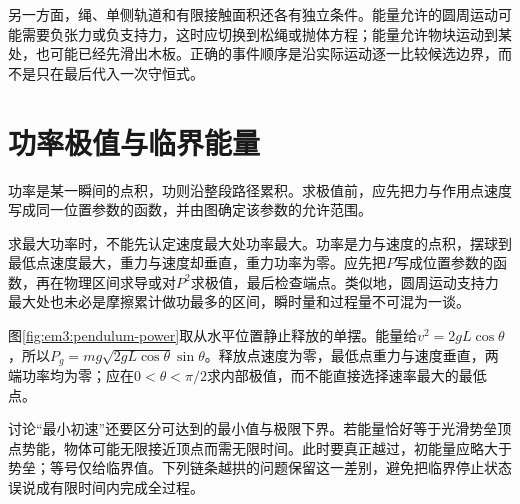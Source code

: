 另一方面，绳、单侧轨道和有限接触面积还各有独立条件。能量允许的圆周运动可能需要负张力或负支持力，这时应切换到松绳或抛体方程；能量允许物块运动到某处，也可能已经先滑出木板。正确的事件顺序是沿实际运动逐一比较候选边界，而不是只在最后代入一次守恒式。

\section{功率极值与临界能量}

功率是某一瞬间的点积，功则沿整段路径累积。求极值前，应先把力与作用点速度写成同一位置参数的函数，并由图确定该参数的允许范围。

求最大功率时，不能先认定速度最大处功率最大。功率是力与速度的点积，摆球到最低点速度最大，重力与速度却垂直，重力功率为零。应先把$P$写成位置参数的函数，再在物理区间求导或对$P^2$求极值，最后检查端点。类似地，圆周运动支持力最大处也未必是摩擦累计做功最多的区间，瞬时量和过程量不可混为一谈。

图\ref{fig:em3:pendulum-power}取从水平位置静止释放的单摆。能量给$v^2=2gL\cos\theta$，所以$P_g=mg\sqrt{2gL\cos\theta}\sin\theta$。释放点速度为零，最低点重力与速度垂直，两端功率均为零；应在$0<\theta<\pi/2$求内部极值，而不能直接选择速率最大的最低点。


讨论“最小初速”还要区分可达到的最小值与极限下界。若能量恰好等于光滑势垒顶点势能，物体可能无限接近顶点而需无限时间。此时要真正越过，初能量应略大于势垒；等号仅给临界值。下列链条越拱的问题保留这一差别，避免把临界停止状态误说成有限时间内完成全过程。

